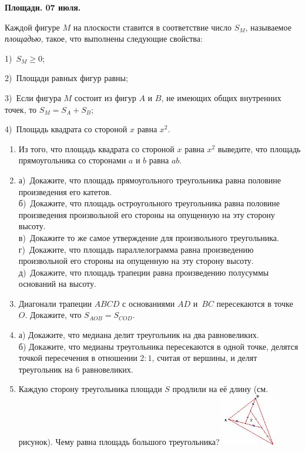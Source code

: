 \begin{center}
\Large
\textbf{Площади. 07 июля.  }
\end{center}


 Каждой фигуре $M$ на плоскости ставится в соответствие
число $S_M$, называемое {\it площадью}, такое, что выполнены следующие
свойства:

1)~$S_M\geq 0$;

2)~Площади равных фигур равны;

3)~Если фигура $M$ состоит из фигур $A$ и $B$, не имеющих общих внутренних
точек, то $S_M = S_A + S_B$;

4)~Площадь квадрата со стороной  $x$ равна $x^2$.


\begin{enumerate}

\item Из того, что площадь квадрата со стороной $x$ равна $x^{2}$ выведите, что площадь прямоугольника со сторонами $a$ и $b$ равна $ab$.

\item а)~Докажите, что площадь прямоугольного треугольника равна половине произведения
его катетов.\\
б)~Докажите, что площадь остроугольного треугольника равна половине произведения
произвольной его стороны на опущенную на эту сторону высоту.\\
в)~Докажите то же самое утверждение для произвольного треугольника.\\
г)~Докажите, что площадь параллелограмма равна произведению
произвольной его стороны на опущенную на эту сторону высоту.\\
д)~Докажите, что площадь трапеции равна произведению полусуммы оснований на высоту.

\item 
Диагонали трапеции $ABCD$ с основаниями $AD$ и~$BC$ пересекаются в точке $O$.
Докажите, что $S_{AOB} = S_{COD}$.

\item а) Докажите, что медиана делит треугольник на два равновеликих.\\
б) Докажите, что медианы треугольника пересекаются в одной точке, делятся точкой пересечения в отношении $2 : 1$, считая от вершины,
и делят треугольник на 6 равновеликих.


\item Каждую сторону треугольника площади $S$ продлили на её длину (см. рисунок). Чему равна площадь большого треугольника?
\includegraphics[width=0.2\textwidth]
{square.JPG}


\end{enumerate}
